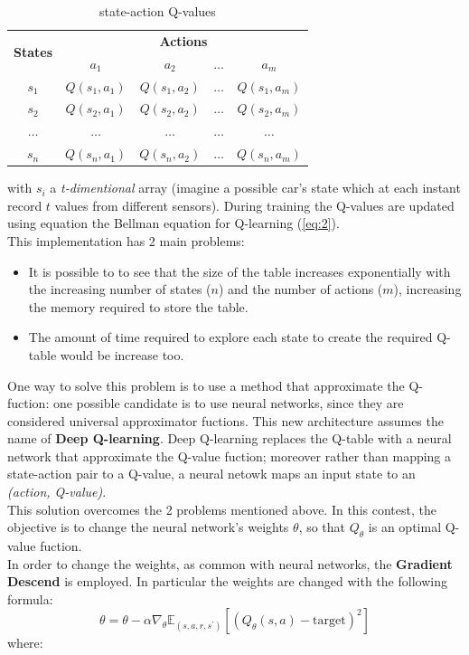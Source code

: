 \documentclass[14pt]{extarticle}
\def\pp{\vspace{10pt}\newline}
\def\ppn{\vspace{10pt}}
\begin{document}
\begin{flushleft}
\begin{table}[H]
\centering
\begin{tabular}{|c|c|c|c|c|}
\hline
\multirow{2}{*}{\textbf{States}} & \multicolumn{4}{c|}{\textbf{Actions}}                                \\ \cline{2-5} 
                                 & \textbf{$a_1$} & \textbf{$a_2$} & \textbf{$\dotso$} & \textbf{$a_m$} \\ \hline
$s_1$  				& $Q(s_1,a_1)$   				& $Q(s_1,a_2)$  				&  $\dotso$  				& $Q(s_1,a_m)$                \\ \hline
$s_2$  				& $Q(s_2,a_1)$   				& $Q(s_2,a_2)$  				&  $\dotso$  				& $Q(s_2,a_m)$                \\ \hline
$\dotso$      &  $\dotso$              	& $\dotso$              	&  $\dotso$              & $\dotso$              \\ \hline
$s_n$  				& $Q(s_n,a_1)$   				& $Q(s_n,a_2)$  				&  $\dotso$  				& $Q(s_n,a_m)$                \\ \hline
\end{tabular}
\caption{state-action Q-values}
\label{tab:my-table}
\end{table}
with $s_i$ a \emph{t-dimentional} array (imagine a possible car's state which at each instant record $t$ values from different sensors).
During training the Q-values are updated using equation the Bellman equation for Q-learning (\ref{eq:2}).
\\
This implementation has 2 main problems:
\begin{itemize}
\item It is possible to to see that the size of the table increases exponentially with the increasing number of states ($n$) and the number of actions ($m$), increasing the memory required to store the table.
\item The amount of time required to explore each state to create the required Q-table would be increase too.
\end{itemize}

\ppn
One way to solve this problem is to use a method that approximate the Q-fuction: one possible candidate is to use neural networks, since they are considered universal approximator fuctions. This new architecture assumes the name of \textbf{Deep Q-learning}. Deep Q-learning replaces the Q-table with a neural network that approximate the Q-value fuction; moreover rather than mapping a state-action pair to a Q-value, a neural netowk maps an input state to an \emph{(action, Q-value)}.
\\
This solution overcomes the 2 problems mentioned above.
\pp
In this contest, the objective is to change the neural network's weights $\theta$, so that $Q_{\theta}$ is an optimal Q-value fuction. \\
In order to change the weights, as common with neural networks, the \textbf{Gradient Descend} is employed. In particular the weights are changed with the following formula:
\[ \theta = \theta - \alpha\nabla_{\theta}\mathbb{E}_{(s,a,r,s^\prime)}[(Q_{\theta}(s,a) - \text{target})^2]\]
where:


\end{flushleft}
\end{document}
